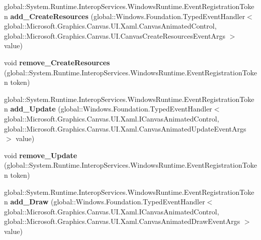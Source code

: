 \begin{DoxyCompactItemize}
global\+::\+System.\+Runtime.\+Interop\+Services.\+Windows\+Runtime.\+Event\+Registration\+Token {\bfseries add\+\_\+\+Create\+Resources} (global\+::\+Windows.\+Foundation.\+Typed\+Event\+Handler$<$ global\+::\+Microsoft.\+Graphics.\+Canvas.\+U\+I.\+Xaml.\+Canvas\+Animated\+Control, global\+::\+Microsoft.\+Graphics.\+Canvas.\+U\+I.\+Canvas\+Create\+Resources\+Event\+Args $>$ value)
\item 
\mbox{\label{interface_microsoft_1_1_graphics_1_1_canvas_1_1_u_i_1_1_xaml_1_1_i_canvas_animated_control_a4911c1a0849c77431433f7738b46dda9}} 
void {\bfseries remove\+\_\+\+Create\+Resources} (global\+::\+System.\+Runtime.\+Interop\+Services.\+Windows\+Runtime.\+Event\+Registration\+Token token)
\item 
\mbox{\label{interface_microsoft_1_1_graphics_1_1_canvas_1_1_u_i_1_1_xaml_1_1_i_canvas_animated_control_aee65ebdd3be32b82bf4a1554f8c2b8c6}} 
global\+::\+System.\+Runtime.\+Interop\+Services.\+Windows\+Runtime.\+Event\+Registration\+Token {\bfseries add\+\_\+\+Update} (global\+::\+Windows.\+Foundation.\+Typed\+Event\+Handler$<$ global\+::\+Microsoft.\+Graphics.\+Canvas.\+U\+I.\+Xaml.\+I\+Canvas\+Animated\+Control, global\+::\+Microsoft.\+Graphics.\+Canvas.\+U\+I.\+Xaml.\+Canvas\+Animated\+Update\+Event\+Args $>$ value)
\item 
\mbox{\label{interface_microsoft_1_1_graphics_1_1_canvas_1_1_u_i_1_1_xaml_1_1_i_canvas_animated_control_aab80ec4a2429b892a73b2956101de68e}} 
void {\bfseries remove\+\_\+\+Update} (global\+::\+System.\+Runtime.\+Interop\+Services.\+Windows\+Runtime.\+Event\+Registration\+Token token)
\item 
\mbox{\label{interface_microsoft_1_1_graphics_1_1_canvas_1_1_u_i_1_1_xaml_1_1_i_canvas_animated_control_a12cf4dde742dabd53cdca14d77e049f4}} 
global\+::\+System.\+Runtime.\+Interop\+Services.\+Windows\+Runtime.\+Event\+Registration\+Token {\bfseries add\+\_\+\+Draw} (global\+::\+Windows.\+Foundation.\+Typed\+Event\+Handler$<$ global\+::\+Microsoft.\+Graphics.\+Canvas.\+U\+I.\+Xaml.\+I\+Canvas\+Animated\+Control, global\+::\+Microsoft.\+Graphics.\+Canvas.\+U\+I.\+Xaml.\+Canvas\+Animated\+Draw\+Event\+Args $>$ value)

\end{DoxyCompactItemize}

